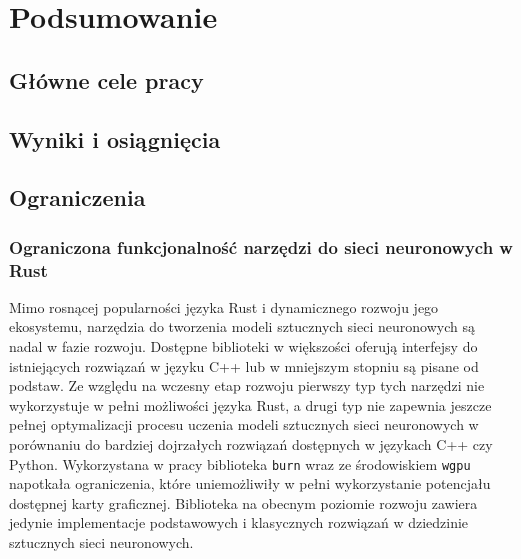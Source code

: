 \cleardoublepage
\section{Podsumowanie}

    \subsection{Główne cele pracy}

    \subsection{Wyniki i osiągnięcia}

    \subsection{Ograniczenia}

        \subsubsection{Ograniczona funkcjonalność narzędzi do sieci neuronowych w Rust}

            Mimo rosnącej popularności języka Rust\cite{Rust:popularity} i dynamicznego rozwoju jego ekosystemu, narzędzia do tworzenia modeli sztucznych sieci neuronowych są nadal w fazie rozwoju. Dostępne biblioteki w większości oferują interfejsy do istniejących rozwiązań w języku C++ lub w mniejszym stopniu są pisane od podstaw. Ze względu na wczesny etap rozwoju pierwszy typ tych narzędzi nie wykorzystuje w pełni możliwości języka Rust, a drugi typ nie zapewnia jeszcze pełnej optymalizacji procesu uczenia modeli sztucznych sieci neuronowych w porównaniu do bardziej dojrzałych rozwiązań dostępnych w językach C++ czy Python. Wykorzystana w pracy biblioteka \texttt{burn} wraz ze środowiskiem \texttt{wgpu} napotkała ograniczenia, które uniemożliwiły w pełni wykorzystanie potencjału dostępnej karty graficznej. Biblioteka na obecnym poziomie rozwoju zawiera jedynie implementacje podstawowych i klasycznych rozwiązań w dziedzinie sztucznych sieci neuronowych.

